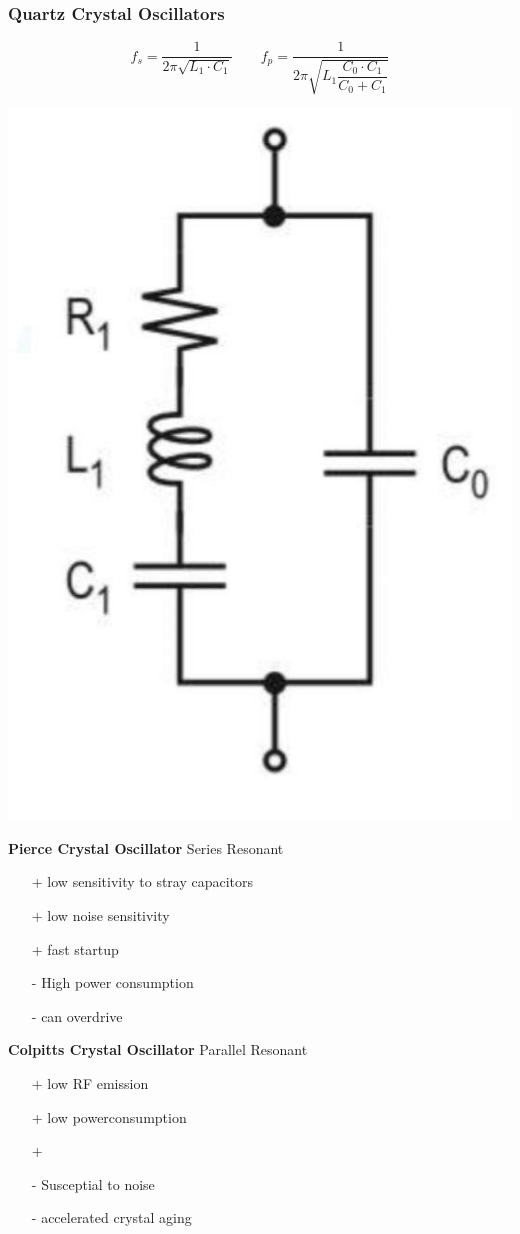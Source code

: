 \subsubsection{Quartz Crystal Oscillators }
\vspace{-1cm}
\begin{minipage}{0.5\linewidth}
    \[ f_s=\dfrac{1}{2\pi \sqrt{L_1 \cdot C_1}}\qquad f_p=\dfrac{1}{2\pi \sqrt{L_1 \dfrac{C_0 \cdot C_1}{C_0 + C_1}}} \]
\end{minipage}
\begin{minipage}{0.5\linewidth}
    \hspace{2cm}\includegraphics[angle=90 ,width=0.4\linewidth]{images/QuartzESB} 
\end{minipage}
\begin{multicols}{2}
    \begin{minipage}{\linewidth}
        \textbf{Pierce Crystal Oscillator}\newline
        Series Resonant
        \begin{itemize}
            \item [+] low sensitivity to stray capacitors
            \item [+] low noise sensitivity
            \item [+] fast startup
            \item [-] High power consumption
            \item [-] can overdrive
        \end{itemize}
    \end{minipage}
    
    \begin{minipage}{\linewidth}
        \textbf{Colpitts Crystal Oscillator}\newline
       Parallel Resonant
        \begin{itemize}
            \item [+] low RF emission
            \item [+] low powerconsumption
            \item [+] 
            \item [-] Susceptial to noise
            \item [-] accelerated crystal aging
        \end{itemize}
    \end{minipage}
\end{multicols}

